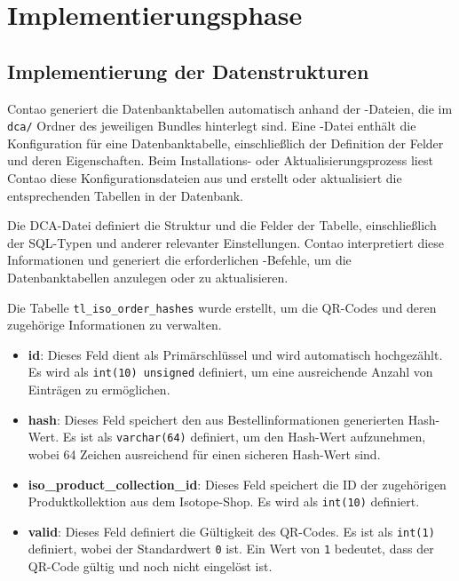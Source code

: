 \section{Implementierungsphase} 
\label{sec:Implementierungsphase}

\subsection{Implementierung der Datenstrukturen}
\label{sec:ImplementierungDatenstrukturen}

Contao generiert die Datenbanktabellen automatisch anhand der -Dateien, die im \texttt{dca/} Ordner des jeweiligen Bundles hinterlegt sind. Eine -Datei enthält die Konfiguration für eine Datenbanktabelle, einschließlich der Definition der Felder und deren Eigenschaften. Beim Installations- oder Aktualisierungsprozess liest Contao diese Konfigurationsdateien aus und erstellt oder aktualisiert die entsprechenden Tabellen in der Datenbank.

Die DCA-Datei definiert die Struktur und die Felder der Tabelle, einschließlich der SQL-Typen und anderer relevanter Einstellungen. Contao interpretiert diese Informationen und generiert die erforderlichen -Befehle, um die Datenbanktabellen anzulegen oder zu aktualisieren.

Die Tabelle \texttt{tl\_iso\_order\_hashes} wurde erstellt, um die QR-Codes und deren zugehörige Informationen zu verwalten.

\begin{itemize}
    \item \textbf{id}: Dieses Feld dient als Primärschlüssel und wird automatisch hochgezählt. Es wird als \texttt{int(10) unsigned} definiert, um eine ausreichende Anzahl von Einträgen zu ermöglichen.
    \item \textbf{hash}: Dieses Feld speichert den aus Bestellinformationen generierten Hash-Wert. Es ist als \texttt{varchar(64)} definiert, um den Hash-Wert aufzunehmen, wobei 64 Zeichen ausreichend für einen sicheren Hash-Wert sind.
    \item \textbf{iso\_product\_collection\_id}: Dieses Feld speichert die ID der zugehörigen Produktkollektion aus dem Isotope-Shop. Es wird als \texttt{int(10)} definiert.
    \item \textbf{valid}: Dieses Feld definiert die Gültigkeit des QR-Codes. Es ist als \texttt{int(1)} definiert, wobei der Standardwert \texttt{0} ist. Ein Wert von \texttt{1} bedeutet, dass der QR-Code gültig und noch nicht eingelöst ist.
\end{itemize}

